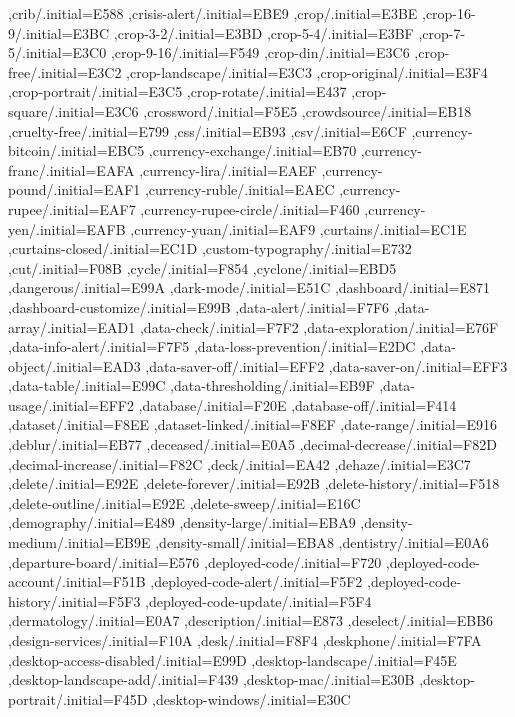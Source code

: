 { ,crib/.initial=E588
 ,crisis-alert/.initial=EBE9
 ,crop/.initial=E3BE
 ,crop-16-9/.initial=E3BC
 ,crop-3-2/.initial=E3BD
 ,crop-5-4/.initial=E3BF
 ,crop-7-5/.initial=E3C0
 ,crop-9-16/.initial=F549
 ,crop-din/.initial=E3C6
 ,crop-free/.initial=E3C2
 ,crop-landscape/.initial=E3C3
 ,crop-original/.initial=E3F4
 ,crop-portrait/.initial=E3C5
 ,crop-rotate/.initial=E437
 ,crop-square/.initial=E3C6
 ,crossword/.initial=F5E5
 ,crowdsource/.initial=EB18
 ,cruelty-free/.initial=E799
 ,css/.initial=EB93
 ,csv/.initial=E6CF
 ,currency-bitcoin/.initial=EBC5
 ,currency-exchange/.initial=EB70
 ,currency-franc/.initial=EAFA
 ,currency-lira/.initial=EAEF
 ,currency-pound/.initial=EAF1
 ,currency-ruble/.initial=EAEC
 ,currency-rupee/.initial=EAF7
 ,currency-rupee-circle/.initial=F460
 ,currency-yen/.initial=EAFB
 ,currency-yuan/.initial=EAF9
 ,curtains/.initial=EC1E
 ,curtains-closed/.initial=EC1D
 ,custom-typography/.initial=E732
 ,cut/.initial=F08B
 ,cycle/.initial=F854
 ,cyclone/.initial=EBD5
 ,dangerous/.initial=E99A
 ,dark-mode/.initial=E51C
 ,dashboard/.initial=E871
 ,dashboard-customize/.initial=E99B
 ,data-alert/.initial=F7F6
 ,data-array/.initial=EAD1
 ,data-check/.initial=F7F2
 ,data-exploration/.initial=E76F
 ,data-info-alert/.initial=F7F5
 ,data-loss-prevention/.initial=E2DC
 ,data-object/.initial=EAD3
 ,data-saver-off/.initial=EFF2
 ,data-saver-on/.initial=EFF3
 ,data-table/.initial=E99C
 ,data-thresholding/.initial=EB9F
 ,data-usage/.initial=EFF2
 ,database/.initial=F20E
 ,database-off/.initial=F414
 ,dataset/.initial=F8EE
 ,dataset-linked/.initial=F8EF
 ,date-range/.initial=E916
 ,deblur/.initial=EB77
 ,deceased/.initial=E0A5
 ,decimal-decrease/.initial=F82D
 ,decimal-increase/.initial=F82C
 ,deck/.initial=EA42
 ,dehaze/.initial=E3C7
 ,delete/.initial=E92E
 ,delete-forever/.initial=E92B
 ,delete-history/.initial=F518
 ,delete-outline/.initial=E92E
 ,delete-sweep/.initial=E16C
 ,demography/.initial=E489
 ,density-large/.initial=EBA9
 ,density-medium/.initial=EB9E
 ,density-small/.initial=EBA8
 ,dentistry/.initial=E0A6
 ,departure-board/.initial=E576
 ,deployed-code/.initial=F720
 ,deployed-code-account/.initial=F51B
 ,deployed-code-alert/.initial=F5F2
 ,deployed-code-history/.initial=F5F3
 ,deployed-code-update/.initial=F5F4
 ,dermatology/.initial=E0A7
 ,description/.initial=E873
 ,deselect/.initial=EBB6
 ,design-services/.initial=F10A
 ,desk/.initial=F8F4
 ,deskphone/.initial=F7FA
 ,desktop-access-disabled/.initial=E99D
 ,desktop-landscape/.initial=F45E
 ,desktop-landscape-add/.initial=F439
 ,desktop-mac/.initial=E30B
 ,desktop-portrait/.initial=F45D
 ,desktop-windows/.initial=E30C
}
